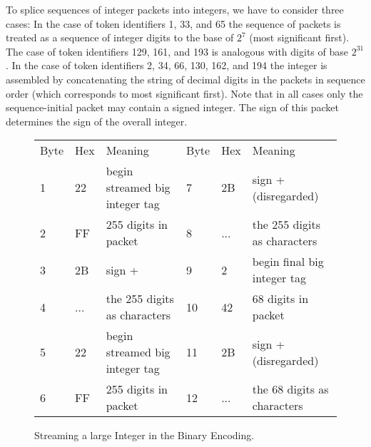 \begin{description}
To splice sequences of integer packets into integers, we have to consider three cases: In
the case of token identifiers 1, 33, and 65 the sequence of packets is treated as a
sequence of integer digits to the base of $2^7$ (most significant first). The case of
token identifiers 129, 161, and 193 is analogous with digits of base $2^{31}$. In the case
of token identifiers 2, 34, 66, 130, 162, and 194 the integer is assembled by
concatenating the string of decimal digits in the packets in sequence order (which
corresponds to most significant first).  Note that in all cases only the sequence-initial
packet may contain a signed integer. The sign of this packet determines the sign of the
overall integer.


\begin{figure}\centering
\begin{tabular}{llllll}
  Byte &Hex &Meaning &  Byte &Hex &Meaning \\
  1 &22 &begin streamed big integer tag & 7 &2B &sign + (disregarded)\\
  2 &FF &255 digits in packet &  8 &... & the 255 digits as characters \\
  3 &2B &sign + & 9 &2 &begin final big integer tag\\
  4 &... & the 255 digits as characters & 10 &42 &68 digits in packet \\
  5 &22 &begin streamed big integer tag & 11 &2B &sign + (disregarded) \\
  6 &FF &255 digits in packet & 12 &... & the 68 digits as characters 
\end{tabular}
\caption{Streaming a large Integer in the Binary Encoding.}\label{fig_bin-enc_stream}
\end{figure}


\end{description}
